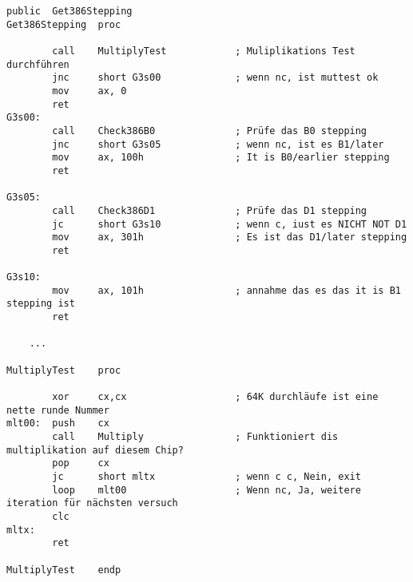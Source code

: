 \begin{lstlisting}[style=customasm]
        public  Get386Stepping
Get386Stepping  proc

        call    MultiplyTest            ; Muliplikations Test durchführen
        jnc     short G3s00             ; wenn nc, ist muttest ok
        mov     ax, 0
        ret
G3s00:
        call    Check386B0              ; Prüfe das B0 stepping
        jnc     short G3s05             ; wenn nc, ist es B1/later
        mov     ax, 100h                ; It is B0/earlier stepping
        ret

G3s05:
        call    Check386D1              ; Prüfe das D1 stepping
        jc      short G3s10             ; wenn c, iust es NICHT NOT D1
        mov     ax, 301h                ; Es ist das D1/later stepping
        ret

G3s10:
        mov     ax, 101h                ; annahme das es das it is B1 stepping ist
        ret

	...

MultiplyTest    proc

        xor     cx,cx                   ; 64K durchläufe ist eine nette runde Nummer
mlt00:  push    cx
        call    Multiply                ; Funktioniert dis multiplikation auf diesem Chip?
        pop     cx
        jc      short mltx              ; wenn c c, Nein, exit
        loop    mlt00                   ; Wenn nc, Ja, weitere iteration für nächsten versuch
        clc
mltx:
        ret

MultiplyTest    endp
\end{lstlisting}

